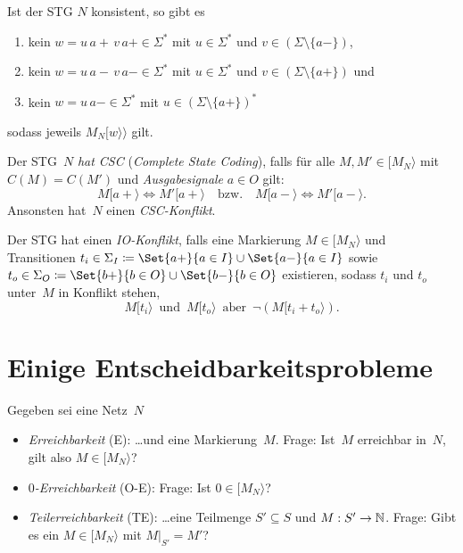 \documentclass{cheat-sheet}
\newcommand{\activeTransition}[1]{[{#1}\rangle} %
\newcommand{\labelledTransition}[1]{[{#1}\rangle\rangle} %
\begin{document}
\begin{beob}
  Ist der STG $N$ konsistent, so gibt es
  \begin{enumerate}
    \item kein $w = u \, a{+} \, v \, a{+} \in \Sigma^*$ mit $u \in \Sigma^*$ und $v \in (\Sigma \setminus \{ a{-} \})$,
    \item kein $w = u \, a{-} \, v \, a{-} \in \Sigma^*$ mit $u \in \Sigma^*$ und $v \in (\Sigma \setminus \{ a{+} \})$ und
    \item kein $w = u \, a{-} \in \Sigma^*$ mit $u \in (\Sigma \setminus \{ a{+} \})^*$
  \end{enumerate}
  sodass jeweils $M_N \labelledTransition{w}$ gilt.
\end{beob}

\begin{defn}
  Der STG~$N$ \emph{hat CSC} (\textit{Complete State Coding}), falls für alle $M, M' \in \activeTransition{M_N}$ mit $C(M) = C(M')$ und \textit{Ausgabesignale} $a \in O$ gilt:
  \[
    M \activeTransition{a {+}} \iff M' \activeTransition{a {+}}
    \quad \text{bzw.} \quad
    M \activeTransition{a {-}} \iff M' \activeTransition{a {-}}.
  \]
  Ansonsten hat~$N$ einen \textit{CSC-Konflikt}.
\end{defn}

\begin{defn}
  Der STG hat einen \emph{IO-Konflikt}, falls eine Markierung $M \in \activeTransition{M_N}$ und Transitionen $t_i \in \Sigma_I \coloneqq \Set{a{+}}{a \in I} \cup \Set{a{-}}{a \in I}$ sowie $t_o \in \Sigma_O \coloneqq \Set{b{+}}{b \in O} \cup \Set{b{-}}{b \in O}$ existieren, sodass $t_i$ und $t_o$ unter~$M$ in Konflikt stehen, \dh{}
  \[
    M \activeTransition{t_i}
    \enspace \text{und} \enspace
    M \activeTransition{t_o}
    \enspace \text{aber} \enspace
    \neg (M \activeTransition{t_i + t_o}).
  \]
\end{defn}



\section{Einige Entscheidbarkeitsprobleme}

\begin{probleme}
  Gegeben sei eine Netz~$N$
  \begin{itemize}
    \item \emph{Erreichbarkeit} (E):
      \ldots und eine Markierung~$M$.
      Frage: Ist~$M$ erreichbar in~$N$, gilt also $M \in \activeTransition{M_N}$?
    \item \emph{$0$-Erreichbarkeit} (O-E):
      Frage: Ist $0 \in \activeTransition{M_N}$?
    \item \emph{Teilerreichbarkeit} (TE):
      \ldots eine Teilmenge $S' \subseteq S$ und $M : S' \to \mathbb{N}$.
      Frage: Gibt es ein $M \in \activeTransition{M_N}$ mit $M|_{S'} = M'$?
  \end{itemize}
\end{probleme}
\end{document}
